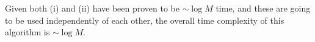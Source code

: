 \begin{problem}
\begin{questions}
Given both (i) and (ii) have been proven to be $\sim \log M$ time, and these are going to be used independently of each other, the overall time complexity of this algorithm is $\sim \log M$.

\end{questions}

\end{problem}


\SUBMITMSG{}
\DEFAULTGRADING{}

